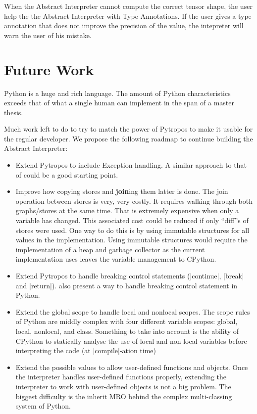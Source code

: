 When the Abstract Interpreter cannot compute the correct tensor shape, the user help the
the Abstract Interpreter with Type Annotations. If the user gives a type annotation that
does not improve the precision of the value, the intepreter will warn the user of his
mistake.

\section{Future Work}\label{future-work}

Python is a huge and rich language. The amount of Python characteristics exceeds that of
what a single human can implement in the span of a master thesis.

Much work left to do to try to match the power of Pytropos to make it usable for the
regular developer. We propose the following roadmap to continue building the Abstract
Interpreter:

\begin{itemize}
\tightlist
\item Extend Pytropos to include Exception handling. A similar approach to that of
  \textcite{fromherz_static_2018} could be a good starting point.
\item Improve how copying stores and \textbf{join}ing them latter is done. The join
  operation between stores is very, very costly. It requires walking through both
  graphs/stores at the same time. That is extremely expensive when only a variable has
  changed. This associated cost could be reduced if only \enquote{diff}s of stores were
  used.  One way to do this is by using immutable structures for all values in the
  implementation. Using immutable structures would require the implementation of a heap
  and garbage collector as the current implementation uses leaves the variable management
  to CPython.
\item Extend Pytropos to handle breaking control statements (\pycode|continue|,
  \pycode|break| and \pycode|return|). \textcite{fromherz_static_2018} also present a way
  to handle breaking control statement in Python.
\item Extend the global scope to handle local and nonlocal scopes. The scope rules of
  Python are middly complex with four different variable scopes: global, local, nonlocal,
  and class. Something to take into account is the ability of CPython to statically
  analyse the use of local and non local variables before interpreting the code (at
  \pycode|compile|-ation time)
\item Extend the possible values to allow user-defined functions and objects.  Once the
  interpreter handles user-defined functions properly, extending the interpreter to work
  with user-defined objects is not a big problem. The biggest difficulty is the inherit
  MRO behind the complex multi-classing system of Python.
\end{itemize}


